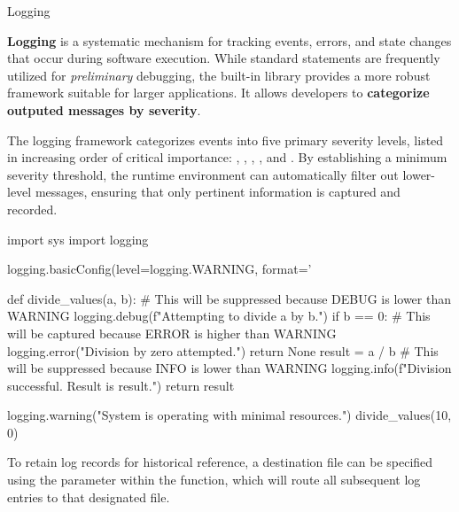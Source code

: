\documentclass[10pt]{article}
\begin{document}
    \begin{core}{Logging}

      \textbf{Logging} is a systematic mechanism for tracking events, errors, and state changes that occur during software execution. While standard  statements are frequently utilized for \textit{preliminary} debugging, the built-in  library provides a more robust framework suitable for larger applications. It allows developers to \textbf{categorize outputed messages by severity}.

      The logging framework categorizes events into five primary severity levels, listed in increasing order of critical importance: , , , , and . By establishing a minimum severity threshold, the runtime environment can automatically filter out lower-level messages, ensuring that only pertinent information is captured and recorded.

      \begin{pyconsole}

        import sys
        import logging

        logging.basicConfig(level=logging.WARNING, format='%

        def divide_values(a, b):
            # This will be suppressed because DEBUG is lower than WARNING
            logging.debug(f"Attempting to divide {a} by {b}.") 
            if b == 0:
                # This will be captured because ERROR is higher than WARNING
                logging.error("Division by zero attempted.")
                return None
            result = a / b
            # This will be suppressed because INFO is lower than WARNING
            logging.info(f"Division successful. Result is {result}.") 
            return result

        logging.warning("System is operating with minimal resources.")
        divide_values(10, 0)

      \end{pyconsole}

      To retain log records for historical reference, a destination file can be specified using the  parameter within the  function, which will route all subsequent log entries to that designated file.

    \end{core}
\end{document}
